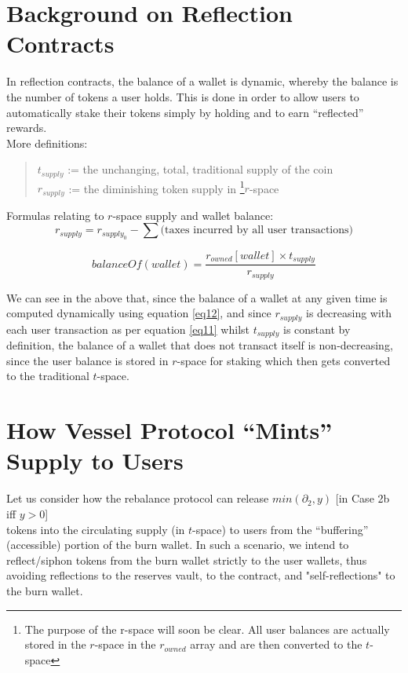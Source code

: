 \documentclass[letterpaper,11pt]{article}
\begin{document}
\section{Background on Reflection Contracts}
In reflection contracts, the balance of a wallet is dynamic, whereby the balance is the number of tokens a user holds. This is done in order to allow users to automatically stake their tokens simply by holding and to earn “reflected” rewards. \\
 
\noindent More definitions:
\begin{quote}
    $t_{supply}$ := the unchanging, total, traditional supply of the coin\\ 
    $r_{supply}$ := the diminishing token supply in \footnote{The purpose of the r-space will soon be clear. All user balances are actually stored in the $r$-space in the $r_{owned}$ array and are then converted to the $t$-space}$r$-space
\end{quote}

\vspace{0.25cm}
\noindent Formulas relating to $r$-space supply and wallet balance:
\begin{equation}\label{eq11}
r_{supply} = r_{supply_0} - \sum \text{(taxes incurred by all user transactions)}
\end{equation}

\begin{equation} \label{eq12}
    balanceOf(wallet) = \frac{r_{owned}[wallet] \times t_{supply}}{r_{supply}}
\end{equation}

\vspace{0.25cm}
We can see in the above that, since the balance of a wallet at any given time is computed dynamically using equation \ref{eq12}, and since $r_{supply}$ is decreasing with each user transaction as per equation \ref{eq11} whilst $t_{supply}$ is constant by definition, the balance of a wallet that does not transact itself is non-decreasing, since the user balance is stored in $r$-space for staking which then gets converted to the traditional $t$-space.

\section{How Vessel Protocol “Mints” Supply to Users}

Let us consider how the rebalance protocol can release $min(\partial_2,y)$ [in Case 2b iff $y>0$]\\tokens into the circulating supply (in $t$-space) to users from the “buffering” (accessible) portion of the burn wallet. In such a scenario, we intend to reflect/siphon tokens from the burn wallet strictly to the user wallets, thus avoiding reflections to the reserves vault, to the contract, and "self-reflections" to the burn wallet. \\
\end{document}
